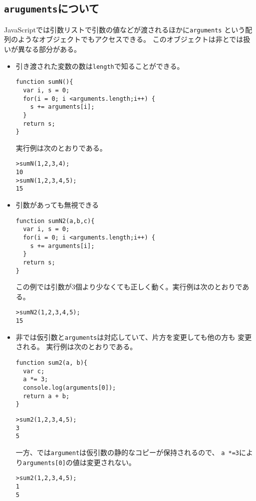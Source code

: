 \subsection{\protect\texttt{aruguments}について}
JavaScriptでは引数リストで引数の値などが渡されるほかに\texttt{arguments}
という配列のようなオブジェクトでもアクセスできる。
このオブジェクトは非\Strict と\Strict では扱いが異なる部分がある。
\begin{itemize}
 \item 引き渡された変数の数は\Verb+length+で知ることができる。
\begin{Verbatim}
function sumN(){
  var i, s = 0;
  for(i = 0; i <arguments.length;i++) {
    s += arguments[i];
  }
  return s;
}
\end{Verbatim}
実行例は次のとおりである。
\begin{Verbatim}
>sumN(1,2,3,4);
10
>sumN(1,2,3,4,5);
15
\end{Verbatim}
 \item 引数があっても無視できる
\begin{Verbatim}
function sumN2(a,b,c){
  var i, s = 0;
  for(i = 0; i <arguments.length;i++) {
    s += arguments[i];
  }
  return s;
}
\end{Verbatim}
この例では引数が3個より少なくても正しく動く。実行例は次のとおりである。
\begin{Verbatim}
>sumN2(1,2,3,4,5);
15

\end{Verbatim}
 \item 非\Strict では仮引数と\Verb+arguments+は対応していて、片方を変更しても他の方も
       変更される。
実行例は次のとおりである。
\begin{Verbatim}
function sum2(a, b){
  var c;
  a *= 3;
  console.log(arguments[0]);
  return a + b;
}
\end{Verbatim}
\begin{Verbatim}
>sum2(1,2,3,4,5);
3 
5
\end{Verbatim}
一方、\Strict では\Verb+argument+は仮引数の静的なコピーが保持されるので、
       \Verb+a *=3+により\Verb+arguments[0]+の値は変更されない。
\begin{Verbatim}
>sum2(1,2,3,4,5);
1
5
\end{Verbatim}
\end{itemize}
\else
